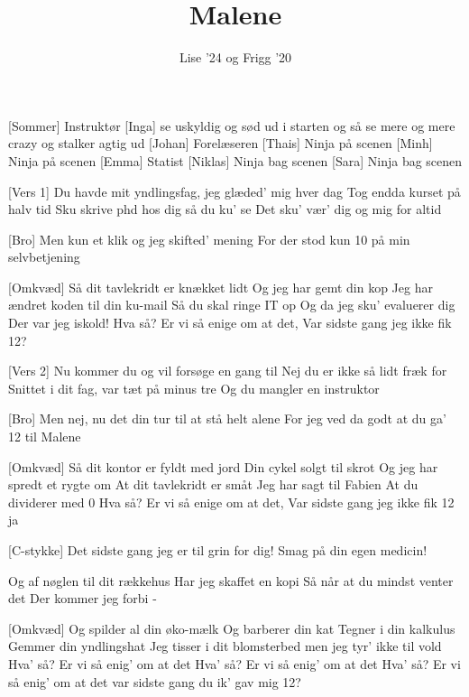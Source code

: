 \documentclass[a4paper,11pt]{article}
\title{Malene}
\author{Lise ’24 og Frigg '20}
\begin{document}
\maketitle

\begin{roles}
[Sommer] Instruktør
[Inga] se uskyldig og sød ud i starten og så se mere og mere crazy og stalker agtig ud
[Johan] Forelæseren
[Thais] Ninja på scenen
[Minh] Ninja på scenen
[Emma] Statist
[Niklas] Ninja bag scenen
[Sara] Ninja bag scenen
\end{roles}

\begin{song}
[Vers 1] Du havde mit yndlingsfag, jeg glæded’ mig hver dag
Tog endda kurset på halv tid
Sku skrive phd
hos dig så du ku’ se
Det sku’ vær’ dig og mig for altid


[Bro] Men kun
et klik og jeg skifted’ mening
For der
stod kun 10 på min selvbetjening

[Omkvæd] Så dit tavlekridt er knækket lidt
Og jeg har gemt din kop
Jeg har ændret koden til din ku-mail
Så du skal ringe IT op
Og da jeg sku' evaluerer dig
Der var jeg iskold!
Hva så? Er vi så enige om at det,
Var sidste gang jeg ikke fik 12?

[Vers 2] Nu kommer du og vil forsøge en gang til
Nej du er ikke så lidt fræk for
Snittet i dit fag, var tæt på minus tre
Og du mangler en instruktor

[Bro] Men nej, nu det din tur til at stå helt alene
For jeg ved da godt at du ga’ 12 til Malene

[Omkvæd] Så dit kontor er fyldt med jord
Din cykel solgt til skrot
Og jeg har spredt et rygte om
At dit tavlekridt er småt
Jeg har sagt til Fabien
At du dividerer med 0
Hva så? Er vi så enige om at det,
Var sidste gang jeg ikke fik 12 ja

[C-stykke] Det sidste gang jeg er til grin for dig!
Smag på din egen medicin!

Og af nøglen til dit rækkehus
Har jeg skaffet en kopi
Så når at du mindst venter det
Der kommer jeg forbi -

[Omkvæd] Og spilder al din øko-mælk
Og barberer din kat
Tegner i din kalkulus
Gemmer din yndlingshat
Jeg tisser i dit blomsterbed
men jeg tyr’ ikke til vold
Hva’ så? Er vi så enig’ om at det
Hva’ så? Er vi så enig’ om at det
Hva’ så? Er vi så enig’ om at det
var sidste gang du ik’ gav mig 12?
\end{song}
\end{document}
